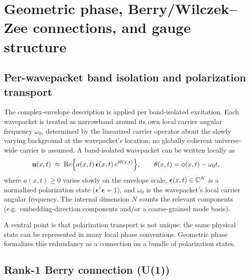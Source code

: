 \section{Geometric phase, Berry/Wilczek--Zee connections, and gauge structure}
\label{sec:geophase}

\subsection{Per-wavepacket band isolation and polarization transport}
\label{subsec:per-wavepacket-isolation}

The complex-envelope description is applied per band-isolated excitation.
Each wavepacket is treated as narrowband around its own local carrier angular frequency $\omega_0$,
determined by the linearized carrier operator about the slowly varying background at the wavepacket's
location; no globally coherent universe-wide carrier is assumed.
A band-isolated wavepacket can be written locally as
\begin{equation}
  \mathbf{u}(x,t)\;\approx\;\mathrm{Re}\Big\{ a(x,t)\,\bm{\epsilon}(x,t)\,e^{\mathrm{i}\theta(x,t)} \Big\},
  \qquad
  \theta(x,t)=\phi(x,t)-\omega_0 t,
  \label{eq:quasi-monochromatic}
\end{equation}
where $a(x,t)\ge 0$ varies slowly on the envelope scale, $\bm{\epsilon}(x,t)\in\mathbb{C}^{N}$ is a normalized
polarization state ($\bm{\epsilon}^\dagger\bm{\epsilon}=1$), and $\omega_0$ is the wavepacket's local carrier
angular frequency.
The internal dimension $N$ counts the relevant components (e.g.\ embedding-direction components and/or a
coarse-grained mode basis).

A central point is that polarization transport is not unique: the same physical state can be represented in many
local phase conventions.
Geometric phase formalizes this redundancy as a connection on a bundle of polarization states.

\subsection{Rank-1 Berry connection (U(1))}

